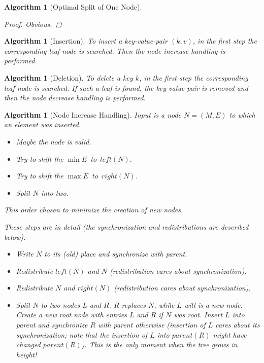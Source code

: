 \documentclass[a4paper, 9pt]{scrartcl}
\theoremstyle{plain}
\newtheorem{algo}[thm]{Algorithm}
\theoremstyle{definition}
\theoremstyle{remark}
\begin{document}
\begin{multicols}{2}
\begin{algo}[Optimal Split of One Node]
\begin{proof}
Obvious.
\end{proof}
\end{algo}


\begin{algo}[Insertion]
To insert a key-value-pair \mbox{$(k, v)$}, in the first step the corresponding
leaf node is searched. Then the node increase handling is performed.
\end{algo}


\begin{algo}[Deletion]
To delete a key $k$, in the first step the corresponding
leaf node is searched. If such a leaf is found, the key-value-pair is removed
and then the node decrease handling is performed.
\end{algo}


\begin{algo}[Node Increase Handling]
Input is a node \mbox{$N = (M, E)$} to which an element was inserted.
\begin{itemize}
\item[1:] Maybe the node is valid.
\item[2:] Try to shift the \mbox{$\min E$ to $left(N)$}.
\item[3:] Try to shift the \mbox{$\max E$ to $right(N)$}.
\item[4:] Split $N$ into two.
\end{itemize}
This order chosen to minimize the creation of new nodes.

These steps are in detail (the synchronization and redistributions are 
described below):
\begin{itemize}
\item[ad 1:] Write $N$ to its (old) place and synchronize with parent.
\item[ad 2:] Redistribute $left(N)$ and $N$ (redistribution cares about
	synchronization).
\item[ad 3:] Redistribute $N$ and $right(N)$ (redistribution cares about
	synchronization).
\item[ad 4:] Split $N$ to two nodes $L$ and $R$. $R$ replaces $N$, while
	$L$ will is a new node. Create a new root node with entries $L$ and $R$
	if $N$ was root. Insert $L$ into parent and synchronize $R$ with parent
	otherwise (insertion of $L$ cares about its synchronization;
	note that the insertion of $L$ into $parent(R)$ {\em might have changed}
	$parent(R)$).
	This is the only moment when the {\em tree grows in height}!
\end{itemize}
\end{algo}



\end{multicols}
\end{document}

